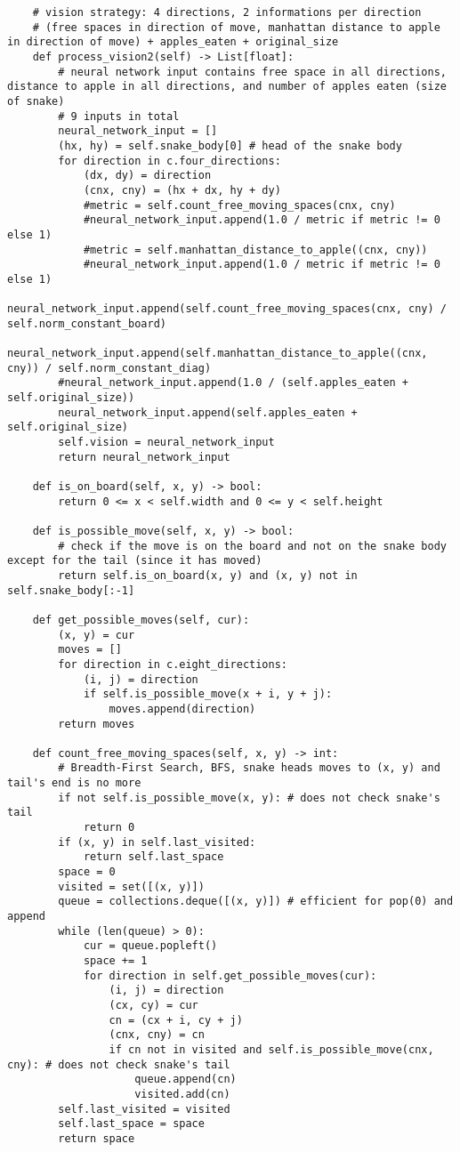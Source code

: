 \documentclass[11pt,a4paper]{article}
\begin{document}
\begin{verbatim}
    # vision strategy: 4 directions, 2 informations per direction
    # (free spaces in direction of move, manhattan distance to apple in direction of move) + apples_eaten + original_size
    def process_vision2(self) -> List[float]:
        # neural network input contains free space in all directions, distance to apple in all directions, and number of apples eaten (size of snake)
        # 9 inputs in total
        neural_network_input = []
        (hx, hy) = self.snake_body[0] # head of the snake body
        for direction in c.four_directions:
            (dx, dy) = direction
            (cnx, cny) = (hx + dx, hy + dy)
            #metric = self.count_free_moving_spaces(cnx, cny)
            #neural_network_input.append(1.0 / metric if metric != 0 else 1)
            #metric = self.manhattan_distance_to_apple((cnx, cny))
            #neural_network_input.append(1.0 / metric if metric != 0 else 1)
            neural_network_input.append(self.count_free_moving_spaces(cnx, cny) / self.norm_constant_board)
            neural_network_input.append(self.manhattan_distance_to_apple((cnx, cny)) / self.norm_constant_diag)
        #neural_network_input.append(1.0 / (self.apples_eaten + self.original_size))
        neural_network_input.append(self.apples_eaten + self.original_size)
        self.vision = neural_network_input
        return neural_network_input

    def is_on_board(self, x, y) -> bool:
        return 0 <= x < self.width and 0 <= y < self.height

    def is_possible_move(self, x, y) -> bool:
        # check if the move is on the board and not on the snake body except for the tail (since it has moved)
        return self.is_on_board(x, y) and (x, y) not in self.snake_body[:-1]

    def get_possible_moves(self, cur):
        (x, y) = cur
        moves = []
        for direction in c.eight_directions:
            (i, j) = direction
            if self.is_possible_move(x + i, y + j):
                moves.append(direction)
        return moves

    def count_free_moving_spaces(self, x, y) -> int:
        # Breadth-First Search, BFS, snake heads moves to (x, y) and tail's end is no more
        if not self.is_possible_move(x, y): # does not check snake's tail
            return 0
        if (x, y) in self.last_visited:
            return self.last_space
        space = 0
        visited = set([(x, y)])
        queue = collections.deque([(x, y)]) # efficient for pop(0) and append
        while (len(queue) > 0):
            cur = queue.popleft()
            space += 1
            for direction in self.get_possible_moves(cur):
                (i, j) = direction
                (cx, cy) = cur
                cn = (cx + i, cy + j)
                (cnx, cny) = cn
                if cn not in visited and self.is_possible_move(cnx, cny): # does not check snake's tail
                    queue.append(cn)
                    visited.add(cn)
        self.last_visited = visited
        self.last_space = space
        return space


\end{verbatim}
\end{document}
